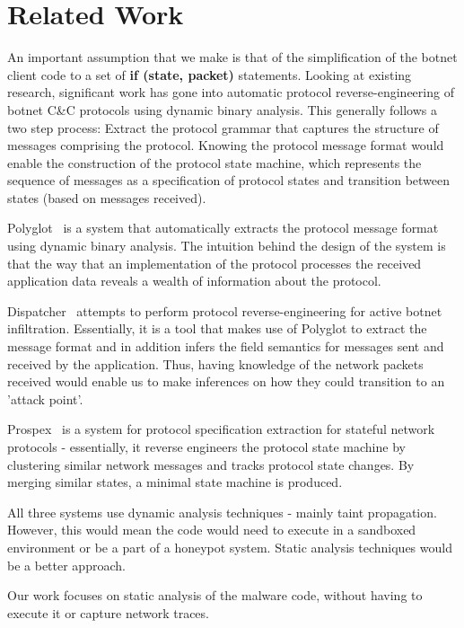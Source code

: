 \documentclass[twocolumn, 11pt]{paper}
\begin{document}
\section{Related Work}
An important assumption that we make is that of the simplification of the botnet client code to a set of \textbf{if (state, packet)} statements. Looking at existing research, significant work has gone into automatic protocol reverse-engineering of botnet C\&C protocols using dynamic binary analysis. This generally follows a two step process: Extract the protocol grammar that captures the structure of messages comprising the protocol. Knowing the protocol message format would enable the construction of the protocol state machine, which represents the sequence of messages as a specification of protocol states and transition between states (based on messages received).

Polyglot~\cite{polyglot} is a system that automatically extracts the protocol message format using dynamic binary analysis. The intuition behind the design of the system is that the  way  that  an  implementation  of  the protocol processes the received application data  reveals a wealth of information about the protocol.

Dispatcher~\cite{dispatcher} attempts to perform protocol reverse-engineering for active botnet infiltration. Essentially, it is a tool that makes use of Polyglot to extract the message format and in addition infers the field semantics for messages sent and received by the application. Thus, having knowledge of the network packets received would enable us to make inferences on how they could transition to an 'attack point'.

Prospex~\cite{prospex} is a system for protocol specification extraction for stateful network protocols - essentially, it reverse engineers the protocol state machine by clustering similar network messages and tracks protocol state changes. By merging similar states, a minimal state machine is produced.

All three systems use dynamic analysis techniques - mainly taint propagation. However, this would mean the code would need to execute in a sandboxed environment or be a part of a honeypot system. Static analysis techniques would be a better approach.

Our work focuses on static analysis of the malware code, without having to execute it or capture network traces.
\end{document}
